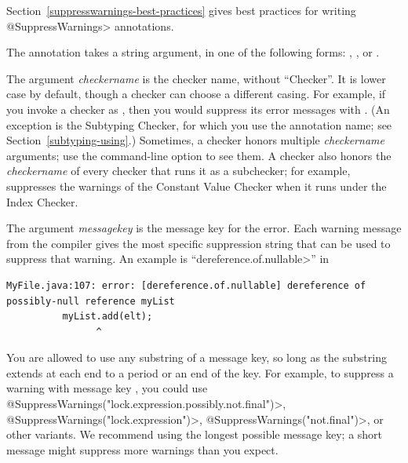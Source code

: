 Section~\ref{suppresswarnings-best-practices} gives best practices for
writing \<@SuppressWarnings> annotations.



The  annotation takes a string argument, in one of
the following forms:
,
,
or
.

The argument \emph{checkername} is the checker name, without ``Checker''.
It is lower case by default, though a checker can choose a different casing.
For
example, if you invoke a checker as
,
then you would suppress its error messages with
.  (An exception is the Subtyping
Checker, for which you use the annotation name; see
Section~\ref{subtyping-using}.)
Sometimes, a checker honors multiple \emph{checkername} arguments; use
the  command-line option to see them.
A checker also honors the \emph{checkername} of every checker that runs it
as a subchecker; for example,  suppresses
the warnings of the Constant Value Checker when it runs under the Index
Checker.

The argument \emph{messagekey} is the message key for the error.
Each warning message from the compiler gives the most specific
suppression string that can be used to suppress that warning.
An example is ``\<dereference.of.nullable>'' in

\begin{smaller}
\begin{Verbatim}
MyFile.java:107: error: [dereference.of.nullable] dereference of possibly-null reference myList
          myList.add(elt);
                ^
\end{Verbatim}
\end{smaller}

\noindent
You are allowed to use any substring of a message key, so long as the
substring extends at each end to a period or an end of the key.  For
example, to suppress a warning with message key
, you could use
\<@SuppressWarnings("lock.expression.possibly.not.final")>,
\<@SuppressWarnings("lock.expression")>,
\<@SuppressWarnings("not.final")>, or other variants.
We recommend using
the longest possible message key; a short message might suppress more
warnings than you expect.

